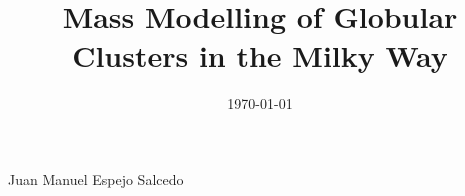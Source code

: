 \documentclass[a4paper, 11pt, oneside]{Thesis}  %
\begin{document}
\frontmatter      %

\title  {Mass Modelling of Globular Clusters in the Milky Way}
            
\authors  
            {{Juan Manuel Espejo Salcedo}}
            
           
\addresses  {\groupname\\\deptname\\\univname}  %
\date       {\today}
\subject    {}
\keywords   {}

\maketitle


\fancyhead{}  %
\rhead{\thepage}  %
\lhead{}  %

\pagestyle{fancy}  %




 
\end{document}
